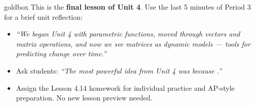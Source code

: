 \documentclass[10pt]{article}
\begin{document}
\begin{skillbox}{goldbox}
This is the \textbf{final lesson of Unit 4}. Use the last 5 minutes of Period 3 for a brief unit reflection:
\begin{itemize}[leftmargin=1.4em, itemsep=1pt]
  \item \textit{``We began Unit 4 with parametric functions, moved through vectors and matrix operations, and now we see matrices as \emph{dynamic models} --- tools for predicting change over time.''}
  \item Ask students: \textit{``The most powerful idea from Unit 4 was \underline{\hspace{4cm}} because \underline{\hspace{4cm}}.''}
  \item Assign the Lesson 4.14 homework for individual practice and AP-style preparation. No new lesson preview needed.
\end{itemize}
\end{skillbox}
\end{document}
